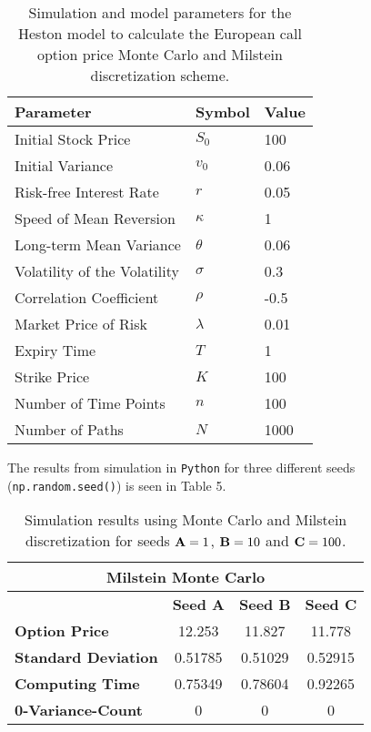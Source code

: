 \documentclass[12pt]{article}
\numberwithin{equation}{section}
\begin{document}
\begin{table}[!h]
    \centering
    \begin{tabular}{lll}
    \toprule
    \textbf{Parameter} & \textbf{Symbol} & \textbf{Value} \\
    \midrule
    Initial Stock Price & $S_0$ & 100 \\
    Initial Variance & $v_0$ & 0.06 \\
    Risk-free Interest Rate & $r$ & 0.05 \\
    Speed of Mean Reversion & $\kappa$ & 1 \\
    Long-term Mean Variance & $\theta$ & 0.06 \\
    Volatility of the Volatility & $\sigma$ & 0.3 \\
    Correlation Coefficient & $\rho$ & -0.5 \\
    Market Price of Risk & $\lambda$ & 0.01 \\
    Expiry Time & $T$ & 1 \\
    Strike Price & $K$ & 100 \\
    Number of Time Points & $n$ & 100 \\
    Number of Paths & $N$ & 1000 \\
    \bottomrule
    \end{tabular}
    \caption{Simulation and model parameters for the Heston model to calculate the European call option price Monte Carlo and Milstein discretization scheme.}
    \label{table:call_option_pricing_parameters2}
    \end{table}
\newpage
The results from simulation in \texttt{Python} for three different seeds
(\texttt{np.random.seed()}) is seen in Table 5.

\begin{table}[ht]
    \centering
    \begin{tabular}{|l|c|c|c|}
    \hline
    \multicolumn{4}{|c|}{\textbf{Milstein Monte Carlo}} \\ \hline
    \textbf{} & \textbf{Seed A} & \textbf{Seed B} & \textbf{Seed C} \\ \hline
    \textbf{Option Price} & 12.253 & 11.827 & 11.778 \\
    \textbf{Standard Deviation} & 0.51785 & 0.51029 & 0.52915 \\
    \textbf{Computing Time} & 0.75349 & 0.78604 & 0.92265 \\
    \textbf{0-Variance-Count} & 0 & 0 & 0 \\ \hline
    \end{tabular}
    \caption{Simulation results using Monte Carlo and Milstein discretization for seeds $\text{\textbf{A}}=1$, $\text{\textbf{B}}=10$ and $\text{\textbf{C}}=100$.}
    \label{table:simulation_results2}
\end{table}
\end{document}
